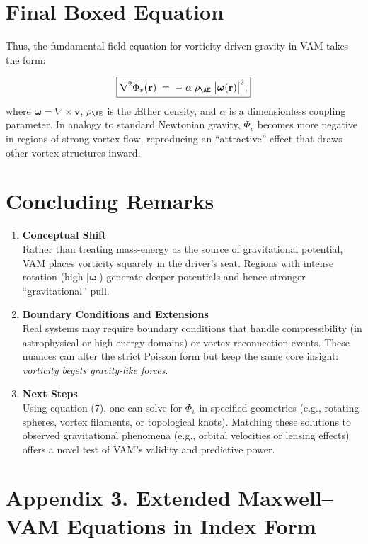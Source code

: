 \documentclass[aps,preprint,superscriptaddress]{revtex4-2}
\begin{document}
    \section{Final Boxed Equation}

    Thus, the fundamental field equation for vorticity-driven gravity in VAM takes the form:

    \[
        \boxed{
            \nabla^2 \Phi_v(\mathbf{r})
            \;=\;
            -\;\alpha\;\rho_{\mathrm{\AE}}\;\bigl|\boldsymbol{\omega}(\mathbf{r})\bigr|^2,
        }
    \]
    where \(\boldsymbol{\omega} = \nabla \times \mathbf{v}\), \(\rho_{\mathrm{\AE}}\) is the Æther density, and \(\alpha\) is a dimensionless coupling parameter. In analogy to standard Newtonian gravity, \(\Phi_v\) becomes more negative in regions of strong vortex flow, reproducing an “attractive” effect that draws other vortex structures inward.

    \section{Concluding Remarks}

    \begin{enumerate}
        \item \textbf{Conceptual Shift} \\
    Rather than treating mass-energy as the source of gravitational potential, VAM places vorticity squarely in the driver’s seat. Regions with intense rotation (high \(|\boldsymbol{\omega}|\)) generate deeper potentials and hence stronger “gravitational” pull.
        \item \textbf{Boundary Conditions and Extensions} \\
        Real systems may require boundary conditions that handle compressibility (in astrophysical or high-energy domains) or vortex reconnection events. These nuances can alter the strict Poisson form but keep the same core insight: \textit{vorticity begets gravity-like forces}.
        \item \textbf{Next Steps} \\
    Using equation (7), one can solve for \(\Phi_v\) in specified geometries (e.g., rotating spheres, vortex filaments, or topological knots). Matching these solutions to observed gravitational phenomena (e.g., orbital velocities or lensing effects) offers a novel test of VAM’s validity and predictive power.
    \end{enumerate}

    \section{Appendix 3. Extended Maxwell--VAM Equations in Index Form}
\end{document}
